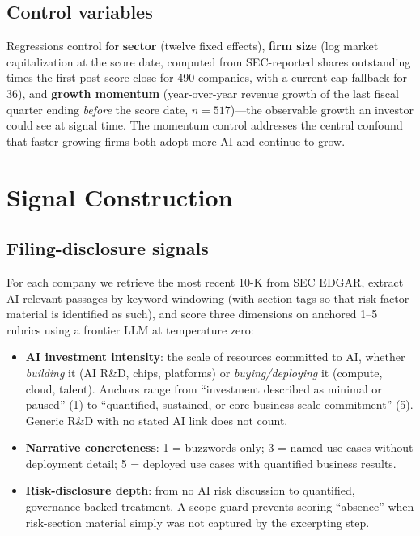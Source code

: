 \documentclass[11pt]{article}
\begin{document}
\subsection{Control variables}

Regressions control for \textbf{sector} (twelve fixed effects),
\textbf{firm size} (log market capitalization at the score date, computed from
SEC-reported shares outstanding times the first post-score close for 490
companies, with a current-cap fallback for 36), and \textbf{growth momentum}
(year-over-year revenue growth of the last fiscal quarter ending \emph{before}
the score date, $n=517$)---the observable growth an investor could see at
signal time. The momentum control addresses the central confound that
faster-growing firms both adopt more AI and continue to grow.

\section{Signal Construction}
\label{sec:signals}

\subsection{Filing-disclosure signals}

For each company we retrieve the most recent 10-K from SEC EDGAR, extract
AI-relevant passages by keyword windowing (with section tags so that
risk-factor material is identified as such), and score three dimensions on
anchored 1--5 rubrics using a frontier LLM at temperature zero:

\begin{itemize}
  \item \textbf{AI investment intensity}: the scale of resources committed to
  AI, whether \emph{building} it (AI R\&D, chips, platforms) or
  \emph{buying/deploying} it (compute, cloud, talent). Anchors range from
  ``investment described as minimal or paused'' (1) to ``quantified, sustained,
  or core-business-scale commitment'' (5). Generic R\&D with no stated AI link
  does not count.
  \item \textbf{Narrative concreteness}: 1 = buzzwords only; 3 = named use
  cases without deployment detail; 5 = deployed use cases with quantified
  business results.
  \item \textbf{Risk-disclosure depth}: from no AI risk discussion to
  quantified, governance-backed treatment. A scope guard prevents scoring
  ``absence'' when risk-section material simply was not captured by the
  excerpting step.
\end{itemize}
\end{document}
